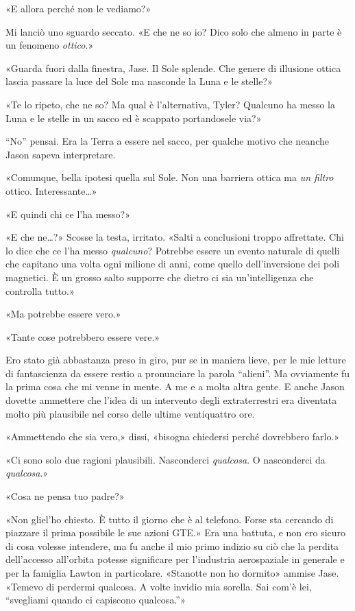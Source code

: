 «E allora perché non le vediamo?»

Mi lanciò uno sguardo seccato. «E che ne so io? Dico solo che almeno in
parte è un fenomeno \emph{ottico}.»

«Guarda fuori dalla finestra, Jase. Il Sole splende. Che genere di
illusione ottica lascia passare la luce del Sole ma nasconde la Luna e
le stelle?»

«Te lo ripeto, che ne so? Ma qual è l'alternativa, Tyler? Qualcuno ha
messo la Luna e le stelle in un sacco ed è scappato portandosele via?»

``No'' pensai. Era la Terra a essere nel sacco, per qualche motivo che
neanche Jason sapeva interpretare.

«Comunque, bella ipotesi quella sul Sole. Non una barriera ottica ma
\emph{un filtro} ottico. Interessante\ldots»

«E quindi chi ce l'ha messo?»

«E che ne\ldots?» Scosse la testa, irritato. «Salti a conclusioni troppo
affrettate. Chi lo dice che ce l'ha messo \emph{qualcuno}? Potrebbe
essere un evento naturale di quelli che capitano una volta ogni milione
di anni, come quello dell'inversione dei poli magnetici. È un grosso
salto supporre che dietro ci sia un'intelligenza che controlla tutto.»

«Ma potrebbe essere vero.»

«Tante cose potrebbero essere vere.»

Ero stato già abbastanza preso in giro, pur se in maniera lieve, per le
mie letture di fantascienza da essere restio a pronunciare la parola
``alieni''. Ma ovviamente fu la prima cosa che mi venne in mente. A me e
a molta altra gente. E anche Jason dovette ammettere che l'idea di un
intervento degli extraterrestri era diventata molto più plausibile nel
corso delle ultime ventiquattro ore.

«Ammettendo che sia vero,» dissi, «bisogna chiedersi perché dovrebbero
farlo.»

«Ci sono solo due ragioni plausibili. Nasconderci \emph{qualcosa}. O
nasconderci da \emph{qualcosa}.»

«Cosa ne pensa tuo padre?»

«Non gliel'ho chiesto. È tutto il giorno che è al telefono. Forse sta
cercando di piazzare il prima possibile le sue azioni GTE.» Era una
battuta, e non ero sicuro di cosa volesse intendere, ma fu anche il mio
primo indizio su ciò che la perdita dell'accesso all'orbita potesse
significare per l'industria aerospaziale in generale e per la famiglia
Lawton in particolare. «Stanotte non ho dormito» ammise Jase. «Temevo di
perdermi qualcosa. A volte invidio mia sorella. Sai com'è lei,
``svegliami quando ci capiscono qualcosa.''»

